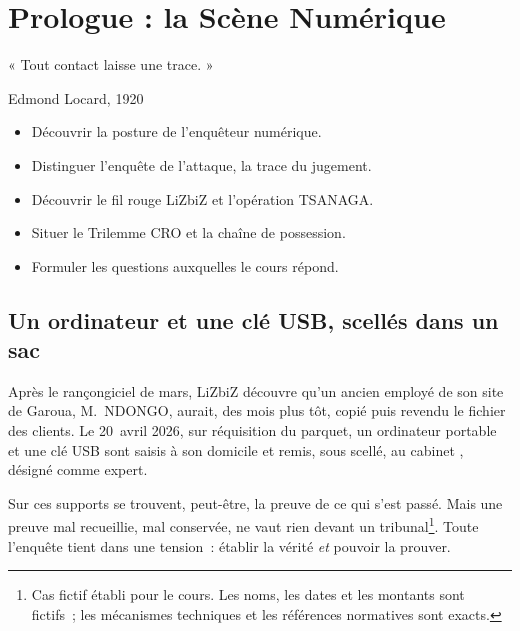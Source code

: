 
\chapter{Prologue : la Scène Numérique}
\label{chap:prologue}

\epigraph{%
    « Tout contact laisse une trace. »%
}{Edmond Locard, 1920}


\begin{boxobjectifs}
\begin{itemize}
    \item Découvrir la posture de l'enquêteur numérique.
    \item Distinguer l'enquête de l'attaque, la trace du jugement.
    \item Découvrir le fil rouge LiZbiZ et l'opération TSANAGA.
    \item Situer le Trilemme CRO et la chaîne de possession.
    \item Formuler les questions auxquelles le cours répond.
\end{itemize}
\end{boxobjectifs}

\bigskip

\section*{Un ordinateur et une clé USB, scellés dans un sac}

Après le rançongiciel de mars, LiZbiZ découvre qu'un ancien employé de son
site de Garoua, M.~NDONGO, aurait, des mois plus tôt, copié puis revendu le
fichier des clients. Le 20~avril 2026, sur réquisition du parquet, un
ordinateur portable et une clé USB sont saisis à son domicile et remis, sous
scellé, au cabinet , désigné comme expert.

\medskip
Sur ces supports se trouvent, peut-être, la preuve de ce qui s'est passé.
Mais une preuve mal recueillie, mal conservée, ne vaut rien devant un
tribunal\footnote{Cas fictif établi pour le cours. Les noms, les dates et les
montants sont fictifs~; les mécanismes techniques et les références
normatives sont exacts.}. Toute l'enquête tient dans une tension~: établir la
vérité \emph{et} pouvoir la prouver.

